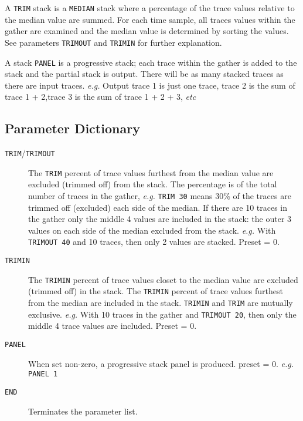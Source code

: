 A \texttt{TRIM} stack is a \texttt{MEDIAN} stack where a percentage of the trace values
relative to the median value are summed.  For each time sample, all
traces values within the \gls{gather} are examined and the median value
is determined by sorting the values.  See parameters \texttt{TRIMOUT} and
\texttt{TRIMIN} for further explanation.

A stack \texttt{PANEL} is a progressive stack; each trace within the \gls{gather}
is added to the stack and the partial stack is output.  There will
be as many stacked traces as there are input traces.  \textit{e.g.} Output
trace 1 is just one trace, trace 2 is the sum of trace 1 + 2,trace 3
is the sum of trace 1 + 2 + 3, \textit{etc}

\subsection{Parameter Dictionary}

\begin{description}
\item[\texttt{TRIM}/\texttt{TRIMOUT}] The \texttt{TRIM} percent of trace values furthest from the median
value are excluded (trimmed off) from the stack.  The percentage
         is of the total number of traces in the \gls{gather},  \textit{e.g.}
         \texttt{TRIM 30} means 30\% of the traces are trimmed off (excluded)
         each side of the median.  If there are 10 traces in the \gls{gather}
         only the middle 4 values are included in the stack: the outer
         3 values on each side of the median excluded from the stack.
         \textit{e.g.} With \texttt{TRIMOUT 40} and 10 traces, then only 2 values are stacked.
         Preset = 0.

\item[\texttt{TRIMIN}] The \texttt{TRIMIN} percent of trace values closet to the median
         value are excluded (trimmed off) in the stack.  The \texttt{TRIMIN}
         percent of trace values furthest from the median are
         included in the stack.  \texttt{TRIMIN} and \texttt{TRIM} are mutually exclusive.
         \textit{e.g.} With 10 traces in the \gls{gather} and \texttt{TRIMOUT 20}, then only the
         middle 4 trace values are included.
         Preset = 0.

\item[\texttt{PANEL}] When set non-zero, a progressive stack panel is produced.
    \Gls{preset} = 0.        \textit{e.g.}    \texttt{PANEL 1}

\item[\texttt{END}] Terminates the parameter list.
\end{description}

